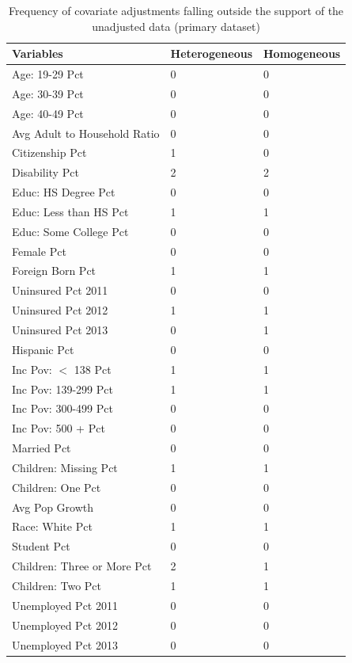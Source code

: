 \begin{table}[h!]
\centering
    \caption{Frequency of covariate adjustments falling outside the support of the unadjusted data \newline (primary dataset)}
    \label{tab:extreme1}
\begin{tabular}{lll}
  \hline
Variables & Heterogeneous & Homogeneous \\ 
  \hline
Age: 19-29 Pct & 0 & 0 \\ 
  Age: 30-39 Pct & 0 & 0 \\ 
  Age: 40-49 Pct & 0 & 0 \\ 
  Avg Adult to Household Ratio & 0 & 0 \\ 
  Citizenship Pct & 1 & 0 \\ 
  Disability Pct & 2 & 2 \\ 
  Educ: HS Degree Pct & 0 & 0 \\ 
  Educ: Less than HS Pct & 1 & 1 \\ 
  Educ: Some College Pct & 0 & 0 \\ 
  Female Pct & 0 & 0 \\ 
  Foreign Born Pct & 1 & 1 \\ 
  Uninsured Pct 2011 & 0 & 0 \\ 
  Uninsured Pct 2012 & 1 & 1 \\ 
  Uninsured Pct 2013 & 0 & 1 \\ 
  Hispanic Pct & 0 & 0 \\ 
  Inc Pov: $<$ 138 Pct & 1 & 1 \\ 
  Inc Pov: 139-299 Pct & 1 & 1 \\ 
  Inc Pov: 300-499 Pct & 0 & 0 \\ 
  Inc Pov: 500 + Pct & 0 & 0 \\ 
  Married Pct & 0 & 0 \\ 
  Children: Missing Pct & 1 & 1 \\ 
  Children: One Pct & 0 & 0 \\ 
  Avg Pop Growth & 0 & 0 \\ 
  Race: White Pct & 1 & 1 \\ 
  Student Pct & 0 & 0 \\ 
  Children: Three or More Pct & 2 & 1 \\ 
  Children: Two Pct & 1 & 1 \\ 
  Unemployed Pct 2011 & 0 & 0 \\ 
  Unemployed Pct 2012 & 0 & 0 \\ 
  Unemployed Pct 2013 & 0 & 0 \\ 
   \hline
\end{tabular}
\end{table}

